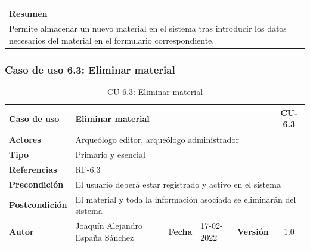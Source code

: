         \begin{table}[H]
            \centering
            \begin{tabularx}{\textwidth}{@{} |L |@{}} \hline
                \textbf{Resumen} \\
                \hline
                Permite almacenar un nuevo material en el sistema tras introducir los datos
                necesarios del material en el formulario correspondiente.\\
                \hline
            \end{tabularx}
        \end{table}


\subsubsection{Caso de uso 6.3: Eliminar material}

    \begin{table}[H]
    \begin{center}
        \begin{adjustbox}{width=\textwidth}
        \begin{tabular}{ | l | l | l | l | c | c | } 
            \hline
            \textbf{Caso de uso} & \multicolumn{4}{l|}{Eliminar material} & \cellcolor{gray!50} \textbf{CU-6.3}\\
            \hline
            \textbf{Actores} & \multicolumn{5}{p{0.9\linewidth}|}{Arqueólogo editor, arqueólogo administrador} \\
            \hline
            \textbf{Tipo} & \multicolumn{5}{l|}{Primario y esencial} \\
            \hline
            \textbf{Referencias} & \multicolumn{3}{l|}{RF-6.3} & \multicolumn{2}{l|}{ }\\
            \hline
            \textbf{Precondición} & \multicolumn{5}{l|}{El usuario deberá estar registrado y activo en el sistema} \\
            \hline
            \textbf{Postcondición} & \multicolumn{5}{l|}{El material y toda la información asociada se eliminarán del sistema} \\
            \hline
            \textbf{Autor} & \multicolumn{1}{p{0.25\linewidth}|}{Joaquín Alejandro España Sánchez} & \textbf{Fecha} & 
            17-02-2022     & \textbf{Versión}                                                      & 1.0\\
            \hline
        \end{tabular}
        \end{adjustbox}
        \caption{CU-6.3: Eliminar material}
        \label{tab:delete-material}
    \end{center}
    \end{table}

